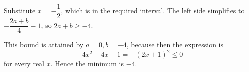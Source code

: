 Substitute $x=-\dfrac{1}{2}$, which is in the required interval. The left side simplifies to $-\dfrac{2a+b}{4}-1$, so $2a+b\ge-4$.

This bound is attained by $a=0,b=-4$, because then the expression is
\[
-4x^2-4x-1=-(2x+1)^2\le0
\]
for every real $x$. Hence the minimum is $\boxed{-4}$.
